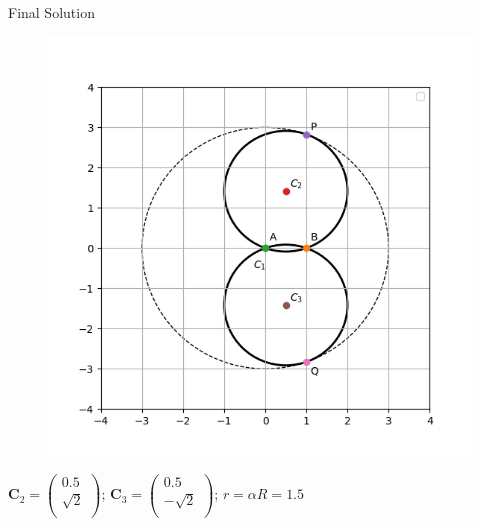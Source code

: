 \documentclass[10pt]{beamer}
\begin{document}
\begin{frame}{Final Solution}
 \begin{figure}[h]
\includegraphics[scale = 0.45]{s5_im1_final_answer.png}

\end{figure}

\quad \quad \qquad  \(\textbf{C}_2 =  \left( {\begin{array}{c}
   0.5 \\
   \sqrt{2} \\
   \end{array} } \right)\)\quad ; \quad\(\textbf{C}_3 =  \left( {\begin{array}{c}
   0.5 \\
   -\sqrt{2} \\
   \end{array} } \right)\)\quad ; \quad \(r = \alpha R = 1.5\)
    
\end{frame}
\end{document}

